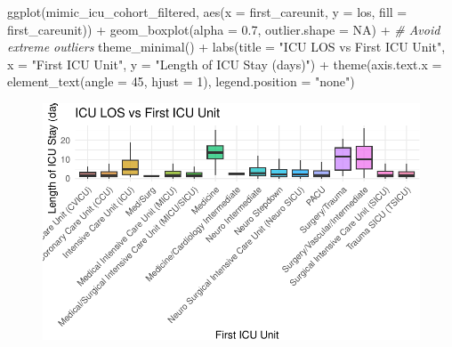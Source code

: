 \documentclass[
]{article}
\newenvironment{Shaded}{\begin{snugshade}}{\end{snugshade}}
\newcommand{\AttributeTok}[1]{\textcolor[rgb]{0.77,0.63,0.00}{#1}}
\newcommand{\CommentTok}[1]{\textcolor[rgb]{0.56,0.35,0.01}{\textit{#1}}}
\newcommand{\ConstantTok}[1]{\textcolor[rgb]{0.00,0.00,0.00}{#1}}
\newcommand{\DecValTok}[1]{\textcolor[rgb]{0.00,0.00,0.81}{#1}}
\newcommand{\FloatTok}[1]{\textcolor[rgb]{0.00,0.00,0.81}{#1}}
\newcommand{\FunctionTok}[1]{\textcolor[rgb]{0.00,0.00,0.00}{#1}}
\newcommand{\NormalTok}[1]{\textcolor[rgb]{0.00,0.00,0.00}{#1}}
\newcommand{\SpecialCharTok}[1]{\textcolor[rgb]{0.00,0.00,0.00}{#1}}
\newcommand{\StringTok}[1]{\textcolor[rgb]{0.31,0.60,0.02}{#1}}
\begin{document}
\begin{Shaded}
\begin{Highlighting}[]
\FunctionTok{ggplot}\NormalTok{(mimic\_icu\_cohort\_filtered, }\FunctionTok{aes}\NormalTok{(}\AttributeTok{x =}\NormalTok{ first\_careunit, }\AttributeTok{y =}\NormalTok{ los, }
                                      \AttributeTok{fill =}\NormalTok{ first\_careunit)) }\SpecialCharTok{+}
  \FunctionTok{geom\_boxplot}\NormalTok{(}\AttributeTok{alpha =} \FloatTok{0.7}\NormalTok{, }\AttributeTok{outlier.shape =} \ConstantTok{NA}\NormalTok{) }\SpecialCharTok{+}  \CommentTok{\# Avoid extreme outliers}
  \FunctionTok{theme\_minimal}\NormalTok{() }\SpecialCharTok{+}
  \FunctionTok{labs}\NormalTok{(}\AttributeTok{title =} \StringTok{"ICU LOS vs First ICU Unit"}\NormalTok{,}
       \AttributeTok{x =} \StringTok{"First ICU Unit"}\NormalTok{, }\AttributeTok{y =} \StringTok{"Length of ICU Stay (days)"}\NormalTok{) }\SpecialCharTok{+}
  \FunctionTok{theme}\NormalTok{(}\AttributeTok{axis.text.x =} \FunctionTok{element\_text}\NormalTok{(}\AttributeTok{angle =} \DecValTok{45}\NormalTok{, }\AttributeTok{hjust =} \DecValTok{1}\NormalTok{), }
        \AttributeTok{legend.position =} \StringTok{"none"}\NormalTok{)}
\end{Highlighting}
\end{Shaded}

\begin{figure}[H]

{\centering \includegraphics{hw3_files/figure-pdf/unnamed-chunk-43-1.pdf}

}

\end{figure}
\end{document}
